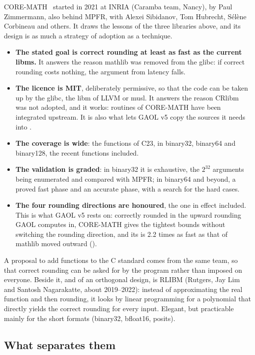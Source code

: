 \documentclass[12pt,a4paper,twoside,openright]{book}
\begin{document}
CORE-MATH~\cite{CoreMath:2022} started in 2021 at INRIA (Caramba team,
Nancy), by Paul Zimmermann, also behind MPFR, with Alexei Sibidanov, Tom
Hubrecht, S\'el\`ene Corbineau and others. It draws the lessons of the
three libraries above, and its design is as much a strategy of adoption as
a technique.
\begin{itemize}
\item[$\bullet$] \textbf{The stated goal is correct rounding at least as
  fast as the current libms.} It answers the reason mathlib was removed
  from the glibc: if correct rounding costs nothing, the argument from
  latency falls.
\item[$\bullet$] \textbf{The licence is MIT}, deliberately permissive, so
  that the code can be taken up by the glibc, the libm of LLVM or musl. It
  answers the reason CRlibm was not adopted, and it works: routines of
  CORE-MATH have been integrated upstream. It is also what lets GAOL v5
  copy the sources it needs into .
\item[$\bullet$] \textbf{The coverage is wide}: the functions of C23, in
  binary32, binary64 and binary128, the recent functions included.
\item[$\bullet$] \textbf{The validation is graded}: in binary32 it is
  exhaustive, the $2^{32}$ arguments being enumerated and compared with
  MPFR; in binary64 and beyond, a proved fast phase and an accurate phase,
  with a search for the hard cases.
\item[$\bullet$] \textbf{The four rounding directions are honoured}, the
  one in effect included. This is what GAOL v5 rests on: correctly rounded
  in the upward rounding GAOL computes in, CORE-MATH gives the tightest
  bounds without switching the rounding direction, and its  is
  2.2 times as fast as that of mathlib moved outward
  ().
\end{itemize}
A proposal to add  functions to the C standard comes from the
same team, so that correct rounding can be asked for by the program rather
than imposed on everyone. Beside it, and of an orthogonal design, is RLIBM
(Rutgers, Jay Lim and Santosh Nagarakatte, about 2019--2022): instead of
approximating the real function and then rounding, it looks by linear
programming for a polynomial that directly yields the correct rounding for
every input. Elegant, but practicable mainly for the short formats
(binary32, bfloat16, posits).

\subsection{What separates them}
\end{document}
